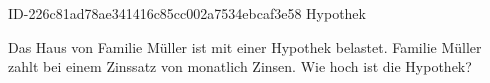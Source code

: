 \begin{exercise}
      {ID-226c81ad78ae341416c85cc002a7534ebcaf3e58}
      {Hypothek}
  \ifproblem\problem\par
    Das Haus von Familie Müller ist mit einer Hypothek belastet. Familie
    Müller zahlt bei einem Zinssatz von  monatlich 
    Zinsen. Wie hoch ist die Hypothek?
  \fi
\end{exercise}
